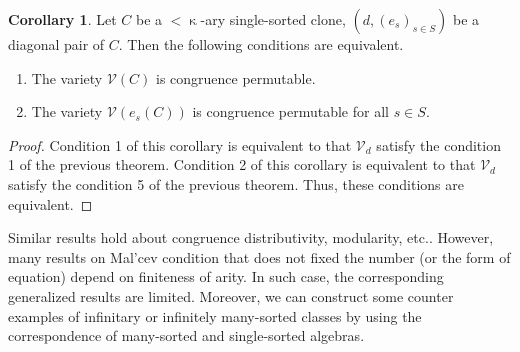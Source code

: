 \documentclass[a4paper,10pt]{article}
\theoremstyle{definition}
\newtheorem{cor}[df]{Corollary}
\newcommand\mc{\mathclose}
\newcommand\V{\mathcal{V}}
\begin{document}
\begin{cor}
Let $C$ be a $<\mc\kappa$-ary single-sorted clone,
$(d,(e_s)_{s\in S})$ be a diagonal pair of $C$. Then the following conditions are equivalent.
\begin{enumerate}
\item
The variety $\V(C)$ is congruence permutable.
\item
The variety $\V(e_s(C))$ is congruence permutable for all $s\in S$.
\end{enumerate}
\end{cor}
\begin{proof}
Condition 1 of this corollary is equivalent to that $\V_d$ satisfy the condition 1 of the previous theorem.
Condition 2 of this corollary is equivalent to that $\V_d$ satisfy the condition 5 of the previous theorem.
Thus, these conditions are equivalent.
\end{proof}


Similar results hold about congruence distributivity, modularity, etc.. 
However, many results on Mal'cev condition that does not fixed the number (or the form of equation)
depend on finiteness of arity.
In such case, the corresponding generalized results are limited.
Moreover, we can construct some counter examples of infinitary or infinitely many-sorted classes
by using the correspondence of many-sorted and single-sorted algebras.
\end{document}
